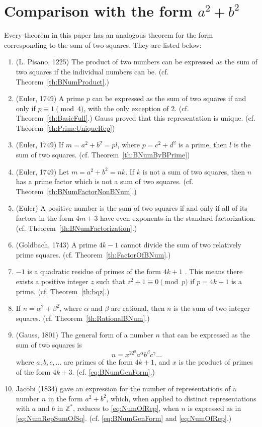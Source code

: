 \documentclass[reqno]{amsart}
\newcommand{\congr}[3]{{\ensuremath{{#1} \equiv {#2}
      \pmod{#3}}}}
\newcommand{\Nonnegative}{\ensuremath{\mathbb{Z^*}}}
\begin{document}
\section{Comparison with the form $a^2+b^2$}
Every theorem in this paper has an analogous theorem
for the form corresponding to the sum of two squares.
They are listed below:
\begin{enumerate}
\item (L. Pisano, 1225) The product of two numbers can be expressed as
  the sum of two squares if the individual numbers can
  be.  \cite[Ch. 6]{DIC1920} (cf. Theorem~\ref{th:BNumProduct}.)
\item (Euler, 1749) A prime $p$ can be expressed as the sum of two
  squares if and only if $\congr{p}{1}{4}$, with the
  only exception of $2$. (cf. Theorem~\ref{th:BasicFull}.)  Gauss
  proved that this representation is unique. (cf. Theorem~\ref{th:PrimeUniqueRep})
\item (Euler, 1749) If $m=a^2+b^2=pl$, where
  $p=c^2+d^2$ is a prime, then $l$ is the sum of two
  squares. \cite[\S{}7.1]{ALL1995} (cf. Theorem~\ref{th:BNumByBPrime})
\item (Euler, 1749) Let $m=a^2+b^2=nk$. If $k$ is not a
 sum of two squares, then $n$ has a prime factor which
 is not a sum of two squares. \cite[\S{}7.1]{ALL1995}
 (cf. Theorem~\ref{th:BNumFactorNonBNum}.)
\item (Euler) A positive number is the sum of two squares if
  and only if all of its factors in the form $4m+3$
  have even exponents in the standard
  factorization. \cite[Th. 366]{HAR1995} (cf. Theorem~\ref{th:BNumFactorization}.)
\item (Goldbach, 1743) A prime $4k-1$ cannot divide the sum of two
  relatively prime squares. \cite[Ch. 6]{DIC1920}
  (cf. Theorem~\ref{th:FactorOfBNum}.)
\item $-1$ is a quadratic residue of primes of the form
  $4k+1$ \cite[Th. 82]{HAR1995}.  This means there exists a
  positive integer $z$ such that \congr{z^2+1}{0}{p} if
  $p=4k+1$ is a prime. (cf. Theorem~\ref{th:bqz}.)
\item If $n = \alpha^2 + \beta^2$, where $\alpha$ and
  $\beta$ are rational, then $n$ is the sum of two
  integer squares.  \cite[Note 7.1.5]{ALL1995} (cf. Theorem~\ref{th:RationalBNum}.)
\item (Gauss, 1801) The general form of a number $n$ that can be
  expressed as the sum of two squares is
  \begin{equation}
  n = x^22^ya^\alpha{}b^\beta{}c^\gamma\ldots
  \label{eq:NumRepSumOfSq}
  \end{equation}
  where
  $a, b, c, \ldots$ are primes of the form
  $4k+1$, and $x$ is the product of primes of the form
  $4k+3$. (cf. \eqref{eq:BNumGenForm}.)
\item Jacobi (1834) gave an expression for the number of
  representations of a number $n$ in the form $a^2+b^2$, which,
  when applied to distinct representations with $a$ and $b$ in \Nonnegative,
  reduces to \eqref{eq:NumOfRep}, when $n$ is expressed
  as in \eqref{eq:NumRepSumOfSq}.  (cf. \eqref{eq:BNumGenForm} and
  \eqref{eq:NumOfRep}.)
\end{enumerate}
\end{document}
